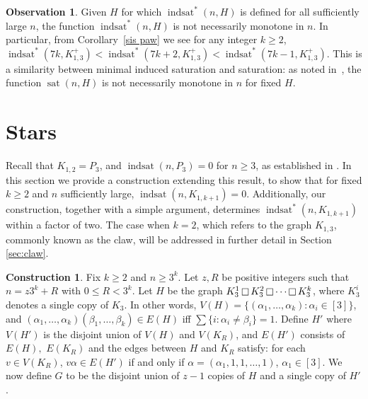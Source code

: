 \documentclass[12pt]{amsart}
\theoremstyle{plain}
\theoremstyle{definition}
\newtheorem{obs}[thm]{Observation}
\newtheorem{cons}[thm]{Construction}
\theoremstyle{remark}
\newcommand{\indsat}[2]{\ensuremath{\operatorname{indsat}(#1,#2)}\xspace}
\newcommand{\sis}[2]{\ensuremath{{\operatorname{indsat}}^*(#1,#2)}\xspace}
\newcommand{\sat}[2]{\ensuremath{\operatorname{sat}(#1,#2)}\xspace}
\newcommand{\paw}{\ensuremath{K_{1,3}^+}\xspace}
\newcommand{\cartprod}{\mathop{\scriptsize\Box}}
\begin{document}
\begin{obs}
Given $H$ for which $\sis{n}{H}$ is defined for all sufficiently large $n$,
the function $\sis{n}{H}$ is not necessarily monotone in $n$. In particular, from Corollary~\ref{sis paw} we see for any integer $k \geq 2$,
$\sis{7k}{\paw}<\sis{7k+2}{\paw}<\sis{7k-1}{\paw}$.
This is a similarity between minimal induced saturation and saturation: as noted in~\cite{FFS}, the function $\sat{n}{H}$ is not necessarily monotone in $n$ for fixed $H$.
\end{obs}








%
%

\section{Stars}
 Recall that $K_{1,2} = P_3$, and $\indsat{n}{P_3} = 0$ for $n \ge 3$, as established in \cite{MS}.  In this section we provide a construction extending this result, to show that for fixed $k \ge 2$ and $n$ sufficiently large, $\indsat{n}{K_{1,k+1}}=0$.  Additionally, our construction, together with a simple argument, determines $\sis{n}{K_{1,k+1}}$ within a factor of two.  The case when $k = 2$, which refers to the graph $K_{1,3}$, commonly known as the claw, will be addressed in further detail in Section \ref{sec:claw}.


\begin{cons}\label{cons:stars}
Fix $k \ge 2$ and $n \ge 3^k$.  Let $z,R$ be positive integers such that $n = z3^k + R$ with $0 \le R < 3^k$.  Let $H$ be the graph $K_3^1 \cartprod K_3^2 \cartprod \cdots \cartprod K_3^k$, where $K_3^i$ denotes a single copy of $K_3$.  In other words, $V(H) = \{(\alpha_1,\dots, \alpha_k) : \alpha_i \in [3]\}$, and $(\alpha_1,\dots, \alpha_k)(\beta_1,\dots, \beta_k) \in E(H)$ iff $\sum \{i:\alpha_i\neq\beta_i\} = 1$.  Define $H'$ where $V(H')$ is  the disjoint union of $V(H)$ and $V(K_R)$, and $E(H')$ consists of $E(H),$ $E(K_R)$ and the edges between $H$ and $K_R$ satisfy: for each $v \in V(K_R)$, $v\alpha \in E(H')$ if and only if $\alpha = (\alpha_1,1,1,\dots,1)$, $\alpha_1 \in [3]$.
We now define $G$ to be the disjoint union of $z-1$ copies of $H$ and a single copy of $H'$.
\end{cons}
\end{document}
